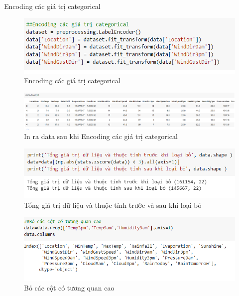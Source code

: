 \documentclass{article}
\begin{document}
\paragraph{}Encoding các giá trị categorical
\begin{figure}[!h]
	\begin{center}
		\includegraphics[width=\linewidth]{images/code22.png}
		\caption{\fontsize{14}{20}\selectfont Encoding các giá trị categorical}
	\end{center}
\end{figure}
\begin{figure}[!h]
	\begin{center}
		\includegraphics[width=\linewidth]{images/code23.png}
		\caption{\fontsize{14}{20}\selectfont In ra data sau khi Encoding các giá trị categorical}
	\end{center}
\end{figure}
\pagebreak

\begin{figure}[!h]
	\begin{center}
		\includegraphics[width=\linewidth]{images/code26.png}
		\caption{\fontsize{14}{20}\selectfont Tổng giá trị dữ liệu và thuộc tính trước và sau khi loại bỏ}
	\end{center}
\end{figure}
\begin{figure}[!h]
	\begin{center}
		\includegraphics[width=\linewidth]{images/code27.png}
		\caption{\fontsize{14}{20}\selectfont Bỏ các cột có tương quan cao}
	\end{center}
\end{figure}
\end{document}
